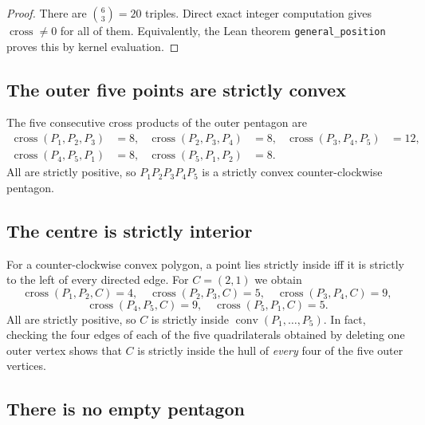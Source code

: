 \documentclass[11pt]{article}
\theoremstyle{remark}
\begin{document}
\begin{proof}
There are $\binom{6}{3}=20$ triples.  Direct exact integer computation gives
$\operatorname{cross}\neq 0$ for all of them.  Equivalently, the Lean theorem
\texttt{general\_position} proves this by kernel evaluation.
\end{proof}

\subsection{The outer five points are strictly convex}

The five consecutive cross products of the outer pentagon are
\begin{equation}
\begin{aligned}
\operatorname{cross}(P_1,P_2,P_3)&=8, &
\operatorname{cross}(P_2,P_3,P_4)&=8, &
\operatorname{cross}(P_3,P_4,P_5)&=12,\\
\operatorname{cross}(P_4,P_5,P_1)&=8, &
\operatorname{cross}(P_5,P_1,P_2)&=8. &&
\end{aligned}
\end{equation}
All are strictly positive, so $P_1P_2P_3P_4P_5$ is a strictly convex
counter-clockwise pentagon.

\subsection{The centre is strictly interior}

For a counter-clockwise convex polygon, a point lies strictly inside iff it
is strictly to the left of every directed edge.  For $C=(2,1)$ we obtain
\begin{equation}
\operatorname{cross}(P_1,P_2,C)=4,\quad
\operatorname{cross}(P_2,P_3,C)=5,\quad
\operatorname{cross}(P_3,P_4,C)=9,
\end{equation}
\begin{equation}
\operatorname{cross}(P_4,P_5,C)=9,\quad
\operatorname{cross}(P_5,P_1,C)=5.
\end{equation}
All are strictly positive, so $C$ is strictly inside
$\operatorname{conv}(P_1,\dots,P_5)$.  In fact, checking the four edges of
each of the five quadrilaterals obtained by deleting one outer vertex shows
that $C$ is strictly inside the hull of \emph{every} four of the five outer
vertices.

\subsection{There is no empty pentagon}
\end{document}
